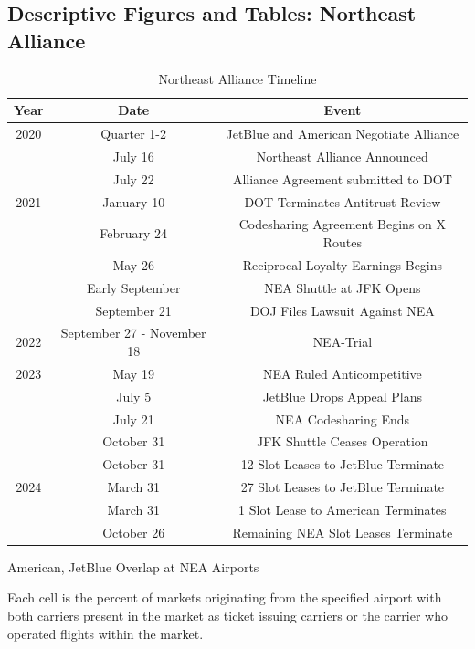 \documentclass{article}
\begin{document}
\begin{appendices}
\FloatBarrier

	\subsection{Descriptive Figures and Tables: Northeast Alliance}

			\begin{table}[h]
		\caption{Northeast Alliance Timeline}
		\label{tab:NEA_Timeline}
		\begin{center}
			\begin{tabular}{ccc}
				\hline
				Year & Date & Event \\
				\hline
				2020 & Quarter 1-2 & JetBlue and American Negotiate Alliance \\ 
				& July 16 & Northeast Alliance Announced \\
				& July 22 & Alliance Agreement submitted to DOT \\
				\hline 
				2021 & January 10 & DOT Terminates Antitrust Review \\
				& February 24 & Codesharing Agreement Begins on {X} Routes \\
				& May 26 & Reciprocal Loyalty Earnings Begins \\
				& Early September & NEA Shuttle at JFK Opens \\
				& September 21 & DOJ Files Lawsuit Against NEA \\  
				\hline
				2022 & September 27 - November 18 & NEA-Trial \\
				\hline 
				2023 & May 19 & NEA Ruled Anticompetitive \\
				& July 5 & JetBlue Drops Appeal Plans \\
				& July 21 & NEA Codesharing Ends \\
				& October 31 & JFK Shuttle Ceases Operation\\
				& October 31 & 12 Slot Leases to JetBlue Terminate \\
				\hline 
				2024 &  March 31  & 27 Slot Leases to JetBlue Terminate \\ 
				& March 31 & 1 Slot Lease to American Terminates \\
				& October 26 & Remaining NEA Slot Leases Terminate				 \end{tabular}
		\end{center}
	\end{table}
	
	
	\begin{table}[h]
		\caption{American, JetBlue Overlap at NEA Airports}
		\label{tab:NEA_Airport_Prescence}
		
		\footnotesize{Each cell is the percent of markets originating from the specified airport with both carriers present in the market as ticket issuing carriers or the carrier who operated flights within the market.}
	\end{table}
	

\end{appendices}
\end{document}
